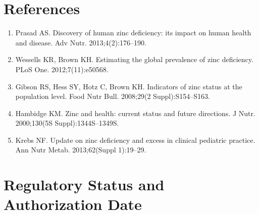 \section*{References}
\begin{enumerate}
  \item Prasad AS. Discovery of human zinc deficiency: its impact on human health and disease. Adv Nutr. 2013;4(2):176--190.
  \item Wessells KR, Brown KH. Estimating the global prevalence of zinc deficiency. PLoS One. 2012;7(11):e50568.
  \item Gibson RS, Hess SY, Hotz C, Brown KH. Indicators of zinc status at the population level. Food Nutr Bull. 2008;29(2 Suppl):S154--S163.
  \item Hambidge KM. Zinc and health: current status and future directions. J Nutr. 2000;130(5S Suppl):1344S--1349S.
  \item Krebs NF. Update on zinc deficiency and excess in clinical pediatric practice. Ann Nutr Metab. 2013;62(Suppl 1):19--29.
\end{enumerate}

\clearpage
\section*{Regulatory Status and Authorization Date}

\clearpage
